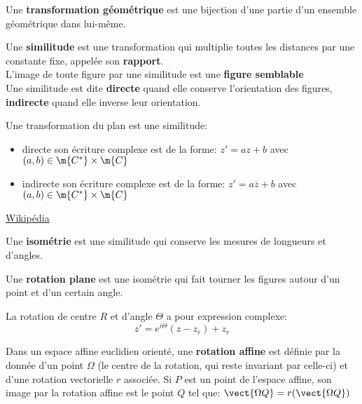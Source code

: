 \def\theme{Transformations du plan. Frises et pavages.}
\def\date{24/10/2023}


Une \textbf{transformation géométrique} est 
une bijection d'une partie d'un ensemble géométrique dans lui-même.

Une \textbf{similitude} est une transformation 
qui multiplie toutes les distances par une constante fixe, appelée son \textbf{rapport}.\\
L'image de toute figure par une similitude est une \textbf{figure semblable}\\
Une similitude est dite \textbf{directe} quand elle conserve l'orientation des figures,
\textbf{indirecte} quand elle inverse leur orientation.

\thm{}
Une transformation du plan est une similitude:
\begin{itemize}
    \item directe 
    \ssi{} son écriture complexe est de la forme:
    $z'=az+b$ avec $(a,b)\in\m{C^*}\times\m{C}$
    \item indirecte
    \ssi{} son écriture complexe est de la forme:
    $z'=a\overline{z}+b$ avec $(a,b)\in\m{C^*}\times\m{C}$
\end{itemize}

\demo{}\href{https://www.wikiwand.com/fr/Similitude_(g%C3%A9om%C3%A9trie)#Expression_complexe}{Wikipédia}

Une \textbf{isométrie} est une similitude qui conserve les mesures de longueurs et d'angles.

Une \textbf{rotation plane} est une isométrie
qui fait tourner les figures autour d'un point et d'un certain angle.

La rotation de centre $R$ et d'angle $\Theta$ a pour expression complexe:
\begin{equation*}
    z'=e^{i\Theta}(z-z_r)+z_r
\end{equation*}

Dans un espace affine euclidien orienté, une \textbf{rotation affine} est définie par la donnée d'un point $\Omega$
(le centre de la rotation, qui reste invariant par celle-ci) et d'une rotation vectorielle $r$ associée.
Si $P$ est un point de l'espace affine, son image par la rotation affine est le point $Q$ tel que:
$\vect{\Omega Q} = r(\vect{\Omega Q})$

